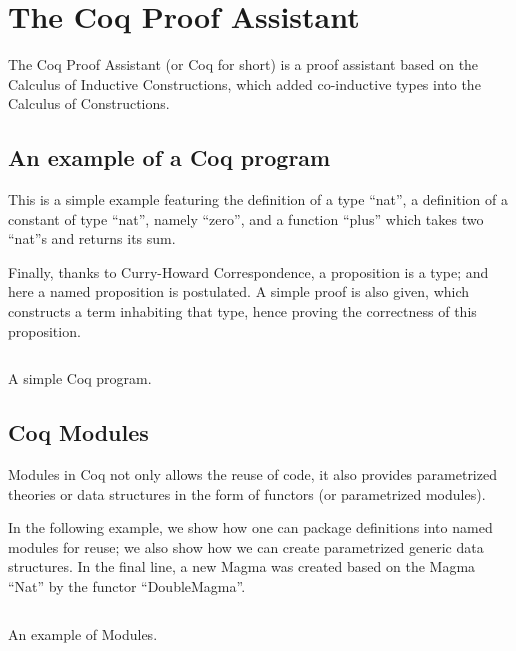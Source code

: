 \chapter{The Coq Proof Assistant}

The Coq Proof Assistant (or Coq for short) is a proof assistant 
based on the Calculus of Inductive Constructions, which added
co-inductive types into the Calculus of Constructions.

\section{An example of a Coq program} This is a simple example featuring the
definition of a type ``nat'', a definition of a constant of type ``nat'', namely
``zero'', and a function ``plus''  which takes two ``nat''s and returns its sum.

Finally, thanks to Curry-Howard Correspondence, a proposition is a type; and
here a named proposition is postulated. A simple proof is also given, which
constructs a term inhabiting that type, hence proving the correctness of this
proposition.

\begin{listing}[!ht]
\inputminted{coq}{code/example.v}
\caption{A simple Coq program.}
\end{listing}

\section{Coq Modules}
Modules in Coq not only allows the reuse of code, it also provides parametrized
theories or data structures in the form of functors (or parametrized modules).

In the following example, we show how one can package definitions into named modules
for reuse; we also show how we can create parametrized generic data structures.
In the final line, a new Magma was created based on the Magma ``Nat''
by the functor ``DoubleMagma''.

\begin{listing}[!ht]
\inputminted{coq}{code/module_example.v}
\caption{An example of Modules.}
\end{listing}
